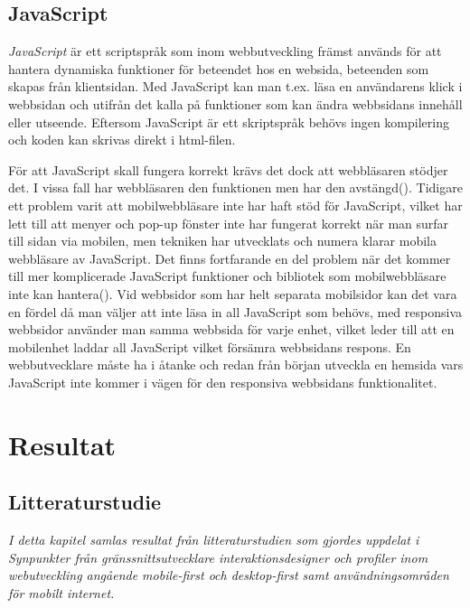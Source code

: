 \documentclass[11pt]{article}
\begin{document}
\subsection{JavaScript}
\textit{JavaScript} är ett scriptspråk som inom webbutveckling främst används för att hantera dynamiska funktioner för beteendet hos en websida, beteenden som skapas från klientsidan. Med JavaScript kan man t.ex. läsa en användarens klick i webbsidan och utifrån det kalla på funktioner som kan ändra webbsidans innehåll eller utseende. Eftersom JavaScript är ett skriptspråk behövs ingen kompilering och koden kan skrivas direkt i html-filen.

För att JavaScript skall fungera korrekt krävs det dock att webbläsaren stödjer det. I vissa fall har webbläsaren den funktionen men har den avstängd(\cite[s.13]{sara_ingmar}). Tidigare ett problem varit att mobilwebbläsare inte har haft stöd för JavaScript, vilket har lett till att menyer och pop-up fönster inte har fungerat korrekt när man surfar till sidan via mobilen, men tekniken har utvecklats och numera klarar mobila webbläsare av JavaScript. Det finns fortfarande en del problem när det kommer till mer komplicerade JavaScript funktioner och bibliotek som mobilwebbläsare inte kan hantera(\cite{quirksmode}). Vid webbsidor som har helt separata mobilsidor kan det vara en fördel då man väljer att inte läsa in all JavaScript som behövs, med responsiva webbsidor använder man samma webbsida för varje enhet, vilket leder till att en mobilenhet laddar all JavaScript vilket försämra webbsidans respons. En webbutvecklare måste ha i åtanke och redan från början utveckla en hemsida vars JavaScript inte kommer i vägen för den responsiva webbsidans funktionalitet.

\newpage

\section{Resultat}
\subsection{Litteraturstudie}
\textit{I detta kapitel samlas resultat från litteraturstudien som gjordes uppdelat i Synpunkter från gränssnittsutvecklare interaktionsdesigner och profiler inom webutveckling angående mobile-first och desktop-first samt användningsområden för mobilt internet.}
\end{document}
